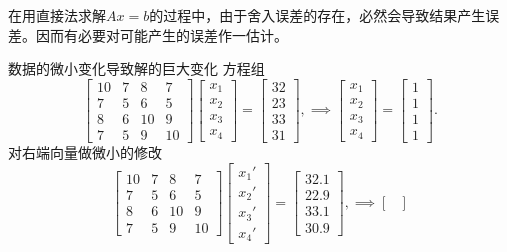 在用直接法求解$Ax=b$的过程中，由于舍入误差的存在，必然会导致结果产生误差。因而有必要对可能产生的误差作一估计。
\begin{example}
    {数据的微小变化导致解的巨大变化}{}
    方程组
    \[
        \begin{bmatrix}
            10&7&8&7\\
            7&5&6&5\\
            8&6&10&9\\
            7&5&9&10
        \end{bmatrix}\begin{bmatrix}
            x_1\\x_2\\x_3\\x_4
        \end{bmatrix}=\begin{bmatrix}
            32\\23\\33\\31
        \end{bmatrix},\implies\begin{bmatrix}
            x_1\\x_2\\x_3\\x_4
        \end{bmatrix}=\begin{bmatrix}
            1\\1\\1\\1
        \end{bmatrix}.
    \]
    对右端向量做微小的修改
    \[
        \begin{bmatrix}
            10&7&8&7\\
            7&5&6&5\\
            8&6&10&9\\
            7&5&9&10
        \end{bmatrix}\begin{bmatrix}
            x_1'\\x_2'\\x_3'\\x_4'
        \end{bmatrix}=\begin{bmatrix}
            32.1\\22.9\\33.1\\30.9
        \end{bmatrix},\implies\begin{bmatrix}

\end{bmatrix}\]
\end{example}
